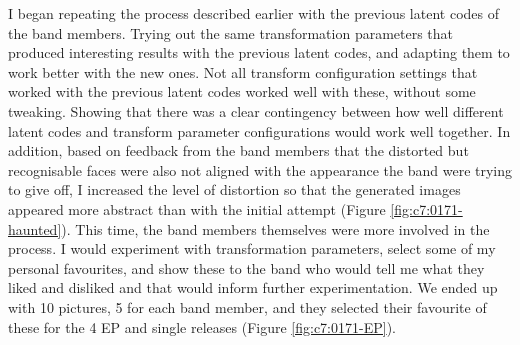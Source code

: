 I began repeating the process described earlier with the previous latent codes of the band members. 
Trying out the same transformation parameters that produced interesting results with the previous latent codes, and adapting them to work better with the new ones. 
Not all transform configuration settings that worked with the previous latent codes worked well with these, without some tweaking. 
Showing that there was a clear contingency between how well different latent codes and transform parameter configurations would work well together.
In addition, based on feedback from the band members that the distorted but recognisable faces were also not aligned with the appearance the band were trying to give off, I increased the level of distortion so that the generated images appeared more abstract than with the initial attempt (Figure \ref{fig:c7:0171-haunted}). 
This time, the band members themselves were more involved in the process. I would experiment with transformation parameters, select some of my personal favourites, and show these to the band who would tell me what they liked and disliked and that would inform further experimentation. 
We ended up with 10 pictures, 5 for each band member, and they selected their favourite of these for the 4 EP and single releases (Figure \ref{fig:c7:0171-EP}). 

